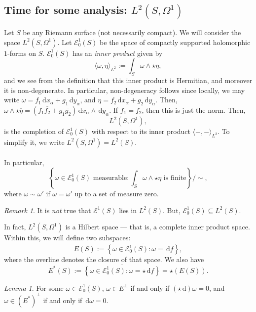 \documentclass[a4paper]{report}
\theoremstyle{definition}
\theoremstyle{remark}
\newtheorem{remark}{Remark}
\theoremstyle{proposition}
\theoremstyle{conjecture}
\theoremstyle{lemma}
\newtheorem{lemma}{Lemma}
\theoremstyle{corollary}
\theoremstyle{exercise}
\theoremstyle{example}
\newcommand{\mcal}{\mathcal}
\newcommand{\diff}{\,\mathrm{d}}
\begin{document}
\subsection{Time for some analysis: $L^2(S,\Omega^1)$}

Let $S$ be any Riemann surface (not necessarily compact). We will consider the 
space $L^2(S,\Omega^1)$. Let $\mcal{E}_0^1(S)$ be the space of compactly 
supported holomorphic $1$-forms on $S$.
$\mcal{E}_0^1(S)$ has an \emph{inner product} given by
$$\langle \omega,\eta\rangle_{L^2} := \int_S\omega \wedge \star\overline{\eta},$$
and we see from the definition that this inner product is Hermitian, and
moreover it is non-degenerate. In particular, non-degeneracy follows since 
locally, we may write $\omega = f_1\diff x_\alpha + g_1 \diff y_\alpha$,
and $\eta = f_2\diff x_\alpha + g_2 \diff y_\alpha$. 
Then, $\omega \wedge \star\overline{\eta} = (f_1\overline{f_2} + g_1\overline{g_2})\diff x_\alpha \wedge \diff y_\alpha$. If $f_1 = f_2$, then this 
is just the norm. Then,
$$L^2(S,\Omega^1),$$ is the completion of $\mcal{E}_0^1(S)$ with respect
to its inner product $\langle-,-\rangle_{L^2}$. To simplify it, we write 
$L^2(S,\Omega^1)=L^2(S)$.\\\\
In particular, $$\left\lbrace \text{$\omega \in \mcal{E}_0^1(S)$ measurable} : \text{$\int_S \omega \wedge\star\eta$ is finite}\right\rbrace/\sim,$$
where $\omega\sim \omega'$ if $\omega = \omega'$ up to a set of measure
zero.

\begin{remark}
    It is \emph{not} true that $\mcal{E}^1(S)$ lies in $L^2(S)$.
    But, $\mcal{E}^1_0(S) \subseteq L^2(S)$.
\end{remark}

In fact, $L^2(S,\Omega^1)$ is a Hilbert space --- that is, a complete 
inner product space. Within this, we will define two subspaces:
$$E(S) := \overline{\left\lbrace \omega \in \mcal{E}^1_0(S) : \omega = \diff f\right\rbrace},$$
where the overline denotes the closure of that space.
We also have 
$$E^\ast(S) := \overline{\left\lbrace \omega \in \mcal{E}^1_0(S) : \omega = \star\diff f\right\rbrace} = \star(E(S)).$$

\begin{lemma}
    For some $\omega \in \mcal{E}^1_0(S)$, $\omega \in E^{\perp}$ if and only 
    if $(\star \diff) \omega = 0$, and 
    $\omega \in (E^\ast)^\perp$ if and only if $\diff\omega = 0$.
\end{lemma}
\end{document}
